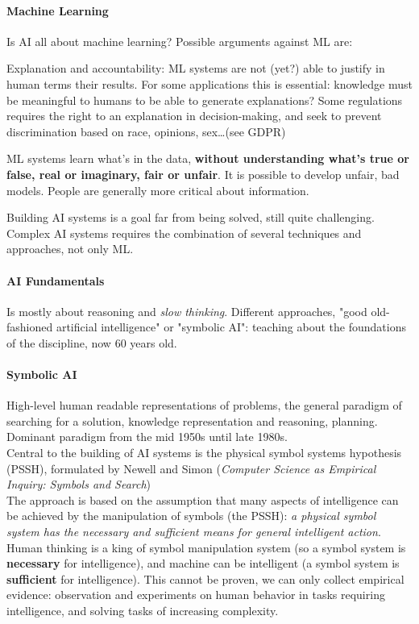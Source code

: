 \documentclass[10pt]{report}
\begin{document}
\paragraph{Machine Learning} Is AI all about machine learning? Possible arguments against ML are:
\begin{list}{}{}
	\item Explanation and accountability: ML systems are not (yet?) able to justify in human terms their results. For some applications this is essential: knowledge must be meaningful to humans to be able to generate explanations? Some regulations requires the right to an explanation in decision-making, and seek to prevent discrimination based on race, opinions, sex\ldots (see GDPR)
	\item ML systems learn what's in the data, \textbf{without understanding what's true or false, real or imaginary, fair or unfair}. It is possible to develop unfair, bad models. People are generally more critical about information.
\end{list}
Building AI systems is a goal far from being solved, still quite challenging. Complex AI systems requires the combination of several techniques and approaches, not only ML.
\paragraph{AI Fundamentals} Is mostly about reasoning and \textit{slow thinking}. Different approaches, "good old-fashioned artificial intelligence" or "symbolic AI": teaching about the foundations of the discipline, now 60 years old.
\paragraph{Symbolic AI} High-level human readable representations of problems, the general paradigm of searching for a solution, knowledge representation and reasoning, planning. Dominant paradigm from the mid 1950s until late 1980s.\\
Central to the building of AI systems is the physical symbol systems hypothesis (PSSH), formulated by Newell and Simon (\textit{Computer Science as Empirical Inquiry: Symbols and Search})\\
The approach is based on the assumption that many aspects of intelligence can be achieved by the manipulation of symbols (the PSSH): \textit{a physical symbol system has the necessary and sufficient means for general intelligent action}.\\
Human thinking is a king of symbol manipulation system (so a symbol system is \textbf{necessary} for intelligence), and machine can be intelligent (a symbol system is \textbf{sufficient} for intelligence). This cannot be proven, we can only collect empirical evidence: observation and experiments on human behavior in tasks requiring intelligence, and solving tasks of increasing complexity.
\end{document}
